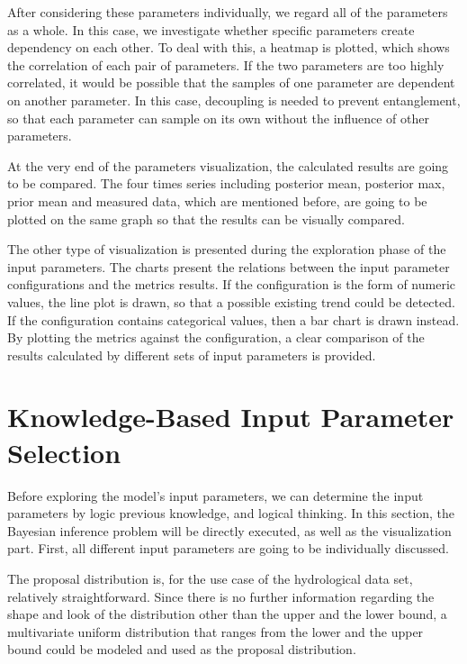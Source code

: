 After considering these parameters individually, we regard all of the parameters as a whole. In this case, we investigate whether specific parameters create dependency on each other. To deal with this, a heatmap is plotted, which shows the correlation of each pair of parameters. If the two parameters are too highly correlated, it would be possible that the samples of one parameter are dependent on another parameter. In this case, decoupling is needed to prevent entanglement, so that each parameter can sample on its own without the influence of other parameters.

At the very end of the parameters visualization, the calculated results are going to be compared. The four times series including posterior mean, posterior max, prior mean and measured data, which are mentioned before, are going to be plotted on the same graph so that the results can be visually compared.

The other type of visualization is presented during the exploration phase of the input parameters. The charts present the relations between the input parameter configurations and the metrics results. If the configuration is the form of numeric values, the line plot is drawn, so that a possible existing trend could be detected. If the configuration contains categorical values, then a bar chart is drawn instead. By plotting the metrics against the configuration, a clear comparison of the results calculated by different sets of input parameters is provided.

\section{Knowledge-Based Input Parameter Selection}

Before exploring the model's input parameters, we can determine the input parameters by logic previous knowledge, and logical thinking. In this section, the Bayesian inference problem will be directly executed, as well as the visualization part. First, all different input parameters are going to be individually discussed.

The proposal distribution is, for the use case of the hydrological data set, relatively straightforward. Since there is no further information regarding the shape and look of the distribution other than the upper and the lower bound, a multivariate uniform distribution that ranges from the lower and the upper bound could be modeled and used as the proposal distribution.

